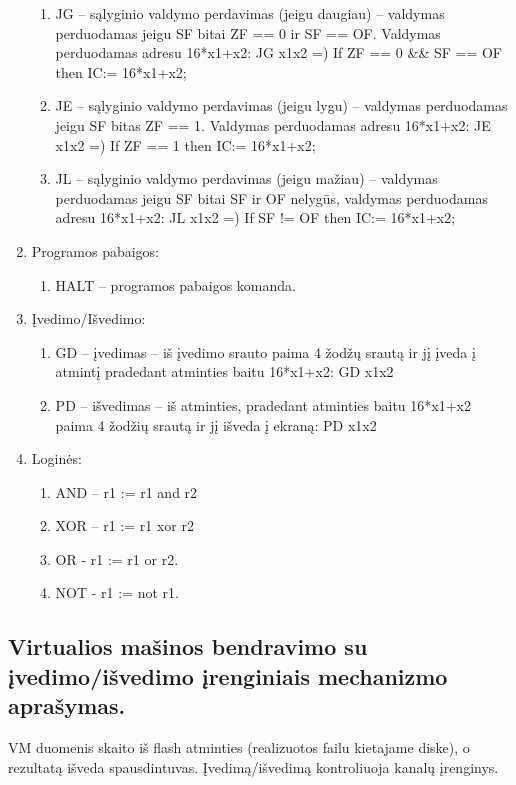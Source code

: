 \documentclass[oneside]{VUMIFPSkursinis}
\begin{document}
\begin{enumerate}
\begin{enumerate}
\item JG – sąlyginio valdymo perdavimas (jeigu daugiau) – valdymas perduodamas jeigu
SF bitai ZF == 0 ir SF == OF. Valdymas perduodamas adresu 16*x1+x2:
JG x1x2 =) If ZF == 0 && SF == OF then IC:= 16*x1+x2;
\item JE – sąlyginio valdymo perdavimas (jeigu lygu) – valdymas perduodamas jeigu SF bitas ZF == 1.
Valdymas perduodamas adresu 16*x1+x2:
JE x1x2 =) If ZF == 1 then IC:= 16*x1+x2;
\item JL – sąlyginio valdymo perdavimas (jeigu mažiau) – valdymas perduodamas jeigu
SF bitai SF ir OF nelygūs, valdymas perduodamas adresu 16*x1+x2:
JL x1x2 =) If SF != OF then IC:= 16*x1+x2;
\end{enumerate}
\item Programos pabaigos:
\begin{enumerate}
\item HALT – programos pabaigos komanda.
\end{enumerate}
\item Įvedimo/Išvedimo:
\begin{enumerate}
\item GD – įvedimas – iš įvedimo srauto paima 4 žodžų srautą ir jį įveda į atmintį
pradedant atminties baitu 16*x1+x2:
GD x1x2
\item PD – išvedimas – iš atminties, pradedant atminties baitu 16*x1+x2  paima 4 žodžių
srautą ir jį išveda į ekraną:
PD x1x2
\end{enumerate}
\item Loginės:
\begin{enumerate}
\item AND – r1 := r1 and r2
\item XOR – r1 := r1 xor r2
\item OR - r1 := r1 or r2.
\item NOT - r1 := not r1.
\end{enumerate}
\end{enumerate}
\subsection{Virtualios mašinos bendravimo su įvedimo/išvedimo įrenginiais mechanizmo aprašymas.}
VM duomenis skaito iš flash atminties (realizuotos failu kietajame diske), o rezultatą išveda spausdintuvas. Įvedimą/išvedimą kontroliuoja kanalų įrenginys.
\end{document}
